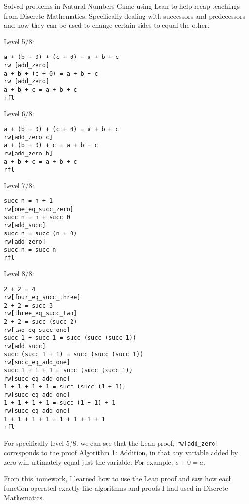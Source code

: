 \documentclass{article}
\theoremstyle{theorem}
\theoremstyle{definition}
\theoremstyle{remark}
\begin{document}
Solved problems in Natural Numbers Game using Lean to help recap teachings from Discrete Mathematics. Specifically dealing with successors and predecessors and how they can be used to change certain sides to equal the other.

Level 5/8:
\begin{lstlisting}
a + (b + 0) + (c + 0) = a + b + c
rw [add_zero]
a + b + (c + 0) = a + b + c
rw [add_zero]
a + b + c = a + b + c
rfl
\end{lstlisting}

Level 6/8:
\begin{lstlisting}
a + (b + 0) + (c + 0) = a + b + c
rw[add_zero c]
a + (b + 0) + c = a + b + c
rw[add_zero b]
a + b + c = a + b + c
rfl
\end{lstlisting}

Level 7/8:
\begin{lstlisting}
succ n = n + 1
rw[one_eq_succ_zero]
succ n = n + succ 0
rw[add_succ]
succ n = succ (n + 0)
rw[add_zero]
succ n = succ n
rfl
\end{lstlisting}

Level 8/8:
\begin{lstlisting}
2 + 2 = 4
rw[four_eq_succ_three]
2 + 2 = succ 3
rw[three_eq_succ_two]
2 + 2 = succ (succ 2)
rw[two_eq_succ_one]
succ 1 + succ 1 = succ (succ (succ 1))
rw[add_succ]
succ (succ 1 + 1) = succ (succ (succ 1))
rw[succ_eq_add_one]
succ 1 + 1 + 1 = succ (succ (succ 1))
rw[succ_eq_add_one]
1 + 1 + 1 + 1 = succ (succ (1 + 1))
rw[succ_eq_add_one]
1 + 1 + 1 + 1 = succ (1 + 1) + 1
rw[succ_eq_add_one]
1 + 1 + 1 + 1 = 1 + 1 + 1 + 1
rfl
\end{lstlisting}

For specifically level 5/8, we can see that the Lean proof, \texttt{rw[add\_zero]} corresponds to the proof Algorithm 1: Addition, in that any variable added by zero will ultimately equal just the variable. For example: $a + 0 = a$.

From this homework, I learned how to use the Lean proof and saw how each function operated exactly like algorithms and proofs I had used in Discrete Mathematics.

%
%
\end{document}
